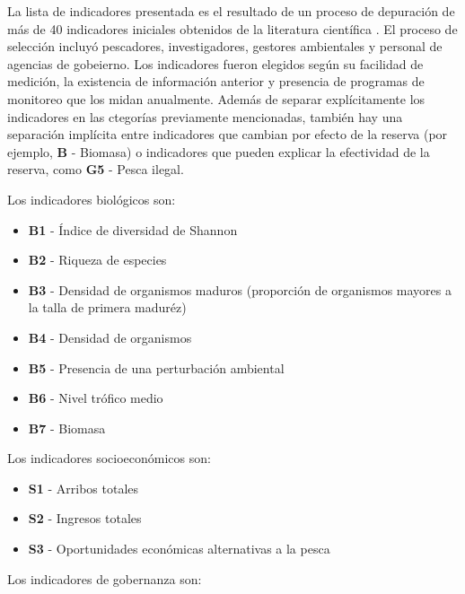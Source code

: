 \documentclass[]{krantz}
\providecommand{\tightlist}{%
  \setlength{\itemsep}{0pt}\setlength{\parskip}{0pt}}
\begin{document}
La lista de indicadores presentada es el resultado de un proceso de
depuración de más de 40 indicadores iniciales obtenidos de la literatura
científica
\citep{halpern_2002, lester_2009, lester_2008, micheli_2012, halpern_2013, basurto_2013, leslie_2015}.
El proceso de selección incluyó pescadores, investigadores, gestores
ambientales y personal de agencias de gobeierno. Los indicadores fueron
elegidos según su facilidad de medición, la existencia de información
anterior y presencia de programas de monitoreo que los midan anualmente.
Además de separar explícitamente los indicadores en las ctegorías
previamente mencionadas, también hay una separación implícita entre
indicadores que cambian por efecto de la reserva (por ejemplo,
\textbf{B} - Biomasa) o indicadores que pueden explicar la efectividad
de la reserva, como \textbf{G5} - Pesca ilegal.

Los indicadores biológicos son:

\begin{itemize}
\tightlist
\item
  \textbf{B1} - Índice de diversidad de Shannon
\item
  \textbf{B2} - Riqueza de especies
\item
  \textbf{B3} - Densidad de organismos maduros (proporción de organismos
  mayores a la talla de primera maduréz)
\item
  \textbf{B4} - Densidad de organismos
\item
  \textbf{B5} - Presencia de una perturbación ambiental
\item
  \textbf{B6} - Nivel trófico medio
\item
  \textbf{B7} - Biomasa
\end{itemize}

Los indicadores socioeconómicos son:

\begin{itemize}
\tightlist
\item
  \textbf{S1} - Arribos totales
\item
  \textbf{S2} - Ingresos totales
\item
  \textbf{S3} - Oportunidades económicas alternativas a la pesca
\end{itemize}

Los indicadores de gobernanza son:
\end{document}
